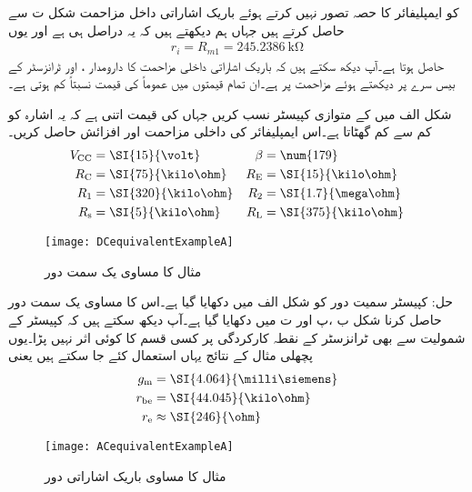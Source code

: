   کو ایمپلیفائر کا حصہ تصور نہیں کرتے ہوئے باریک اشاراتی داخل مزاحمت   شکل  ت سے حاصل کرتے ہیں جہاں ہم دیکھتے ہیں کہ یہ دراصل  ہی ہے اور یوں
\begin{align*}
r_i=R_{m1}=\SI{245.2386}{\kilo \ohm}
\end{align*}
حاصل ہوتا ہے۔آپ دیکھ سکتے ہیں کہ باریک اشاراتی داخلی مزاحمت کا دارومدار ، اور ٹرانزسٹر کے بیس سرے پر دیکھتے ہوئے مزاحمت   پر ہے۔ان تمام قیمتوں میں عموماً  کی قیمت نسبتاً کم ہوتی ہے۔


شکل  الف میں   کے متوازی کپیسٹر  نسب کریں جہاں   کی قیمت اتنی ہے کہ یہ اشارہ کو کم سے کم گھٹاتا ہے۔اس ایمپلیفائر کی داخلی مزاحمت  اور افزائش  حاصل کریں۔
\begin{align*}
V_{\textup{CC}} &=\SI{15}{\volt} & \beta&=\num{179}\\
R_{\textup{C}} &=\SI{75}{\kilo \ohm} &  R_{\textup{E}} &=\SI{15}{\kilo \ohm}\\
R_{\textup{1}} &=\SI{320}{\kilo \ohm} & R_{\textup{2}} &=\SI{1.7}{\mega \ohm}\\
R_{\textup{s}} &=\SI{5}{\kilo \ohm} & R_{\textup{L}} &=\SI{375}{\kilo \ohm}
\end{align*}
%
\begin{figure}
\centering
\texttt{[image: DCequivalentExampleA]}
\caption{مثال کا مساوی یک سمت دور}
\label{شکل_مثال_کا_مساوی_یک_سمتی_دور_الف}
\end{figure}
حل: کپیسٹر سمیت دور کو شکل  الف میں دکھایا گیا ہے۔اس کا مساوی یک سمت دور حاصل کرنا شکل  ب ،پ اور ت میں دکھایا گیا ہے۔آپ دیکھ سکتے ہیں کہ کپیسٹر  کے شمولیت سے بھی ٹرانزسٹر کے نقطہ کارکردگی پر کسی قسم کا کوئی اثر نہیں پڑا۔یوں پچھلی مثال کے نتائج یہاں استعمال کئے جا سکتے ہیں یعنی
\begin{align*}
g_{\textup{m}} &=\SI{4.064}{\milli \siemens}\\
r_{\textup{be}}&=\SI{44.045}{\kilo \ohm}\\
r_{\textup{e}} &\approx \SI{246}{\ohm}
\end{align*}
%
\begin{figure}
\centering
\texttt{[image: ACequivalentExampleA]}
\caption{مثال کا مساوی باریک اشاراتی دور}
\label{شکل_کا_باریک_اشاراتی_دور_الف}
\end{figure}
